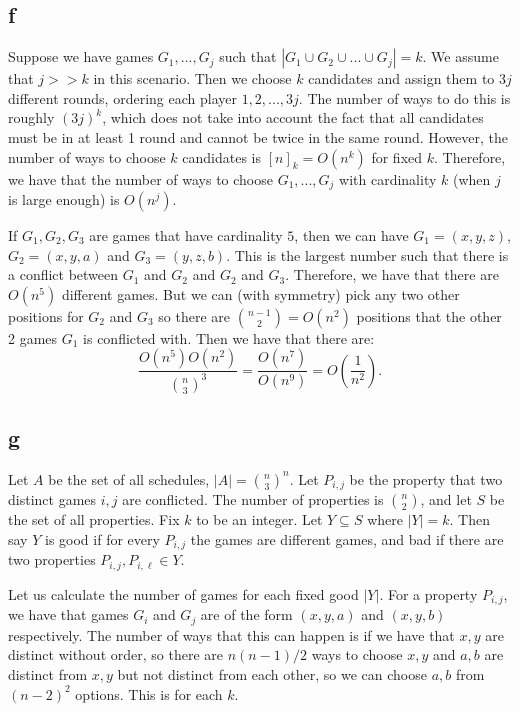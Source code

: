 \documentclass[]{article}
\theoremstyle{definition}
\numberwithin{theorem}{section}
\numberwithin{equation}{section}
\begin{document}
\subsection{f}
Suppose we have games $G_1, ..., G_j$ such that $|G_1 \cup G_2 \cup ... \cup G_j| = k$. We assume that $j >> k$ in this scenario. Then we choose $k$ candidates and assign them to $3j$ different rounds, ordering each player $1, 2, ..., 3j$. The number of ways to do this is roughly $(3j)^k$, which does not take into account the fact that all candidates must be in at least 1 round and cannot be twice in the same round. However, the number of ways to choose $k$ candidates is $[n]_k  = O(n^k)$ for fixed $k$. Therefore, we have that the number of ways to choose $G_1, ..., G_j$ with cardinality $k$ (when $j$ is large enough) is $O(n^j)$. 
\par
If $G_1, G_2, G_3$ are games that have cardinality $5$, then we can have $G_1 = (x, y, z)$, $G_2 = (x, y, a)$ and $G_3 = (y, z, b)$. This is the largest number such that there is a conflict between $G_1$ and $G_2$ and $G_2$ and $G_3$. Therefore, we have that there are $O(n^5)$ different games. But we can (with symmetry) pick any two other positions for $G_2$ and $G_3$ so there are $\binom{n - 1 }{2} = O(n^2)$ positions that the other 2 games $G_1$ is conflicted with. Then we have that there are:
\begin{equation}
	\frac{O(n^5) O(n^2)}{\binom{n}{3}^3} = \frac{O(n^7)}{O(n^9)} = O(\frac{1}{n^2}).
\end{equation}

\subsection{g}
Let $A$ be the set of all schedules, $|A| = \binom{n}{3}^n$. 
Let $P_{i,j}$ be the property that two distinct games $i, j$ are conflicted. The number of properties is $\binom{n}{2}$, and let $S$ be the set of all properties. 
Fix $k$ to be an integer. 
Let $Y \subseteq S$ where $|Y| = k$. Then say $Y$ is good if for every $P_{i, j}$ the games are different games, and bad if there are two properties $P_{i, j}, P_{i, \ell} \in Y$. 

Let us calculate the number of games for each fixed good $|Y|$. For a property $P_{i, j}$, we have that games $G_i$ and $G_j$ are of the form $(x, y, a)$ and $(x, y, b)$ respectively. The number of ways that this can happen is if we have that $x, y$ are distinct without order, so there are $n(n-1)/2$ ways to choose $x, y$ and $a, b$ are distinct from $x, y$ but not distinct from each other, so we can choose $a, b$ from $(n-2)^2$ options. This is for each $k$.
\end{document}
